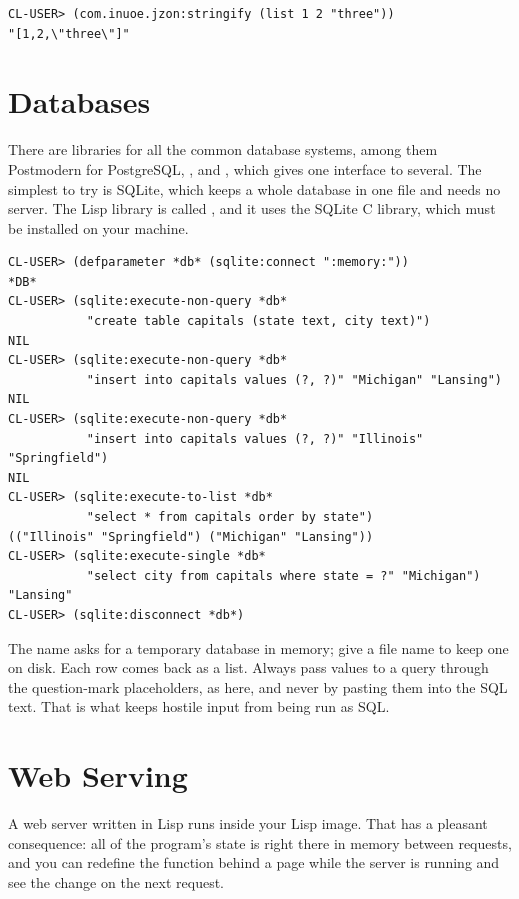 \begin{verbatim}
CL-USER> (com.inuoe.jzon:stringify (list 1 2 "three"))
"[1,2,\"three\"]"
\end{verbatim}

\section{Databases}

There are libraries for all the common database systems, among them
Postmodern for PostgreSQL, , and , which
gives one interface to several. The simplest to try is SQLite, which
keeps a whole database in one file and needs no server. The Lisp
library is called , and it uses the SQLite C library,
which must be installed on your machine.

\begin{verbatim}
CL-USER> (defparameter *db* (sqlite:connect ":memory:"))
*DB*
CL-USER> (sqlite:execute-non-query *db*
           "create table capitals (state text, city text)")
NIL
CL-USER> (sqlite:execute-non-query *db*
           "insert into capitals values (?, ?)" "Michigan" "Lansing")
NIL
CL-USER> (sqlite:execute-non-query *db*
           "insert into capitals values (?, ?)" "Illinois" "Springfield")
NIL
CL-USER> (sqlite:execute-to-list *db*
           "select * from capitals order by state")
(("Illinois" "Springfield") ("Michigan" "Lansing"))
CL-USER> (sqlite:execute-single *db*
           "select city from capitals where state = ?" "Michigan")
"Lansing"
CL-USER> (sqlite:disconnect *db*)
\end{verbatim}

The name  asks for a temporary database in memory;
give a file name to keep one on disk. Each row comes back as a list.
Always pass values to a query through the question-mark placeholders,
as here, and never by pasting them into the SQL text. That is what
keeps hostile input from being run as SQL.

\section{Web Serving}

A web server written in Lisp runs inside your Lisp image. That has a
pleasant consequence: all of the program's state is right there in
memory between requests, and you can redefine the function behind a
page while the server is running and see the change on the next
request.

